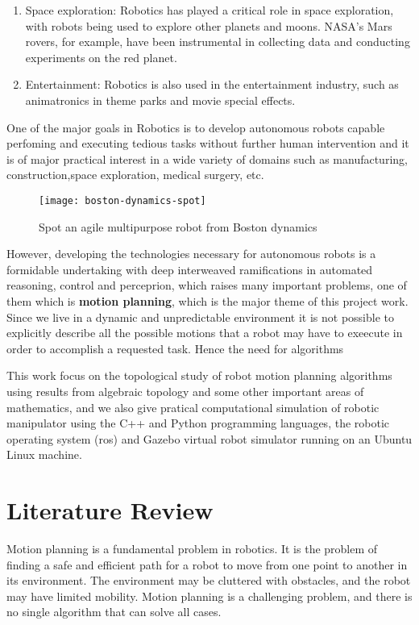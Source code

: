 \begin{enumerate}
    \item Space exploration: Robotics has played a critical role in space exploration, with robots being used to explore other planets and moons. NASA's Mars rovers, for example, have been instrumental in collecting data and conducting experiments on the red planet.

    \item Entertainment: Robotics is also used in the entertainment industry, such as animatronics in theme parks and movie special effects.
\end{enumerate}

One of the major goals in Robotics is to develop autonomous robots capable perfoming and executing tedious tasks without further human intervention and it is of major practical interest in a wide variety of domains such as manufacturing, construction,space exploration, medical surgery, etc.
\begin{figure}[H]
    \centering
    \texttt{[image: boston-dynamics-spot]}
    \caption{Spot an agile multipurpose robot from Boston dynamics} 
\end{figure}
However, developing the technologies necessary for autonomous robots is a formidable undertaking with deep interweaved ramifications in automated reasoning, control and perceprion, which raises many important problems, one of them which is \textbf{motion planning}, which is the major theme of this project work. Since we live in a dynamic and unpredictable environment it is not possible to explicitly describe all the possible motions that a robot may have to exeecute in order to accomplish a requested task. Hence the need for algorithms 

This work focus on the topological study of robot motion planning algorithms using results from algebraic topology and some other important areas of mathematics, and we also give pratical computational simulation of robotic manipulator using the C++ and Python programming languages, the robotic operating system (ros) and Gazebo virtual robot simulator running on an Ubuntu Linux machine.

\section{Literature Review}
Motion planning is a fundamental problem in robotics. It is the problem of finding a safe and efficient path for a robot to move from one point to another in its environment. The environment may be cluttered with obstacles, and the robot may have limited mobility. Motion planning is a challenging problem, and there is no single algorithm that can solve all cases.

